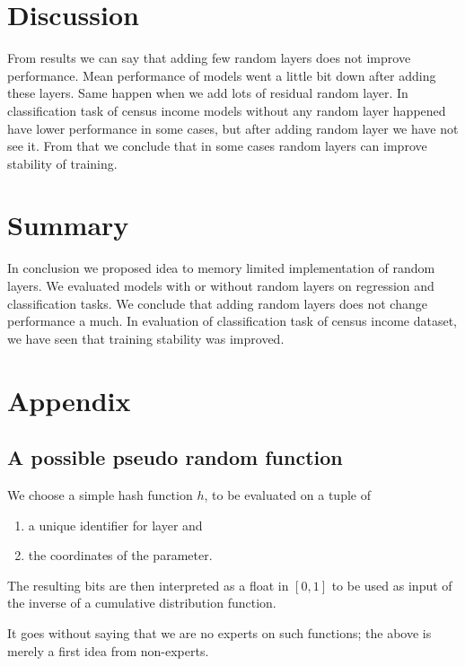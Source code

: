 \documentclass[]{article}
\begin{document}
\begin{multicols}{2}
	\section{Discussion}
	From results we can say that adding few random layers does not improve performance. Mean performance of models went a little bit down after adding these layers. Same happen when we add lots of residual random layer. In classification task of census income models without any random layer happened have lower performance in some cases, but after adding random layer we have not see it. From that we conclude that in some cases random layers can improve stability of training.
	
	\section{Summary}
	In conclusion we proposed idea to memory limited implementation of random layers. We evaluated models with or without random layers on regression and classification tasks. We conclude that adding random layers does not change performance a much. In evaluation of classification task of census income dataset, we have seen that training stability was improved.
	
	\section{Appendix}
	\subsection{A possible pseudo random function}
	We choose a simple hash function $h$, to be evaluated on a tuple of
	\begin{enumerate}
		\itemsep0em
		\item a unique identifier for layer and
		\item the coordinates of the parameter.
	\end{enumerate}
	The resulting bits are then interpreted as a float in $[0, 1]$ to be used as input of the inverse of a cumulative distribution function.

	It goes without saying that we are no experts on such functions; the above is merely a first idea from non-experts.

	
	
\end{multicols}
\end{document}
